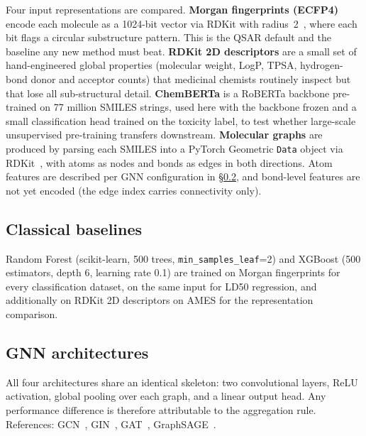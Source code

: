 \documentclass[a4paper,11pt]{article}
\begin{document}
Four input representations are compared. \textbf{Morgan fingerprints (ECFP4)} encode each molecule as a 1024-bit vector via RDKit with radius~2~\cite{morgan1965, chemrev}, where each bit flags a circular substructure pattern. This is the QSAR default and the baseline any new method must beat. \textbf{RDKit 2D descriptors} are a small set of hand-engineered global properties (molecular weight, LogP, TPSA, hydrogen-bond donor and acceptor counts) that medicinal chemists routinely inspect but that lose all sub-structural detail. \textbf{ChemBERTa} is a RoBERTa backbone pre-trained on 77 million SMILES strings, used here with the backbone frozen and a small classification head trained on the toxicity label, to test whether large-scale unsupervised pre-training transfers downstream. \textbf{Molecular graphs} are produced by parsing each SMILES into a PyTorch Geometric \texttt{Data} object via RDKit~\cite{fey2019}, with atoms as nodes and bonds as edges in both directions. Atom features are described per GNN configuration in \S\ref{sec:gnn}, and bond-level features are not yet encoded (the edge index carries connectivity only).

\subsection{Classical baselines}

Random Forest (scikit-learn, 500 trees, \texttt{min\_samples\_leaf}=2) and XGBoost (500 estimators, depth 6, learning rate 0.1) are trained on Morgan fingerprints for every classification dataset, on the same input for LD50 regression, and additionally on RDKit 2D descriptors on AMES for the representation comparison.

\subsection{GNN architectures}
\label{sec:gnn}

All four architectures share an identical skeleton: two convolutional layers, ReLU activation, global pooling over each graph, and a linear output head. Any performance difference is therefore attributable to the aggregation rule. References: GCN~\cite{kipf2017}, GIN~\cite{xu2019}, GAT~\cite{velickovic2018}, GraphSAGE~\cite{hamilton2017}.
\end{document}
